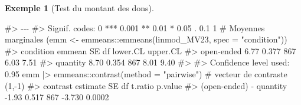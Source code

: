 \documentclass[
  11pt,
  letterpaper,
]{scrbook}
\newenvironment{Shaded}{\begin{snugshade}}{\end{snugshade}}
\newcommand{\AttributeTok}[1]{\textcolor[rgb]{0.40,0.45,0.13}{#1}}
\newcommand{\CommentTok}[1]{\textcolor[rgb]{0.37,0.37,0.37}{#1}}
\newcommand{\FunctionTok}[1]{\textcolor[rgb]{0.28,0.35,0.67}{#1}}
\newcommand{\NormalTok}[1]{\textcolor[rgb]{0.00,0.23,0.31}{#1}}
\newcommand{\OtherTok}[1]{\textcolor[rgb]{0.00,0.23,0.31}{#1}}
\newcommand{\SpecialCharTok}[1]{\textcolor[rgb]{0.37,0.37,0.37}{#1}}
\newcommand{\StringTok}[1]{\textcolor[rgb]{0.13,0.47,0.30}{#1}}
\theoremstyle{plain}
\theoremstyle{plain}
\theoremstyle{definition}
\newtheorem{example}{Exemple}[chapter]
\theoremstyle{definition}
\theoremstyle{remark}
\begin{document}
\begin{example}[Test du montant des
dons]
\begin{Shaded}
\begin{Highlighting}[]
\CommentTok{\#\textgreater{} {-}{-}{-}}
\CommentTok{\#\textgreater{} Signif. codes:  0 \textquotesingle{}***\textquotesingle{} 0.001 \textquotesingle{}**\textquotesingle{} 0.01 \textquotesingle{}*\textquotesingle{} 0.05 \textquotesingle{}.\textquotesingle{} 0.1 \textquotesingle{} \textquotesingle{} 1}
\CommentTok{\# Moyennes marginales}
\NormalTok{(emm }\OtherTok{\textless{}{-}}\NormalTok{ emmeans}\SpecialCharTok{::}\FunctionTok{emmeans}\NormalTok{(linmod\_MV23, }\AttributeTok{spec =} \StringTok{"condition"}\NormalTok{))}
\CommentTok{\#\textgreater{}  condition  emmean    SE  df lower.CL upper.CL}
\CommentTok{\#\textgreater{}  open{-}ended   6.77 0.377 867     6.03     7.51}
\CommentTok{\#\textgreater{}  quantity     8.70 0.354 867     8.01     9.40}
\CommentTok{\#\textgreater{} }
\CommentTok{\#\textgreater{} Confidence level used: 0.95}
\NormalTok{emm }\SpecialCharTok{|\textgreater{}}\NormalTok{ emmeans}\SpecialCharTok{::}\FunctionTok{contrast}\NormalTok{(}\AttributeTok{method =} \StringTok{"pairwise"}\NormalTok{) }\CommentTok{\# vecteur de contraste (1,{-}1)}
\CommentTok{\#\textgreater{}  contrast                estimate    SE  df t.ratio p.value}
\CommentTok{\#\textgreater{}  (open{-}ended) {-} quantity    {-}1.93 0.517 867  {-}3.730  0.0002}
\end{Highlighting}
\end{Shaded}

\end{example}
\end{document}
